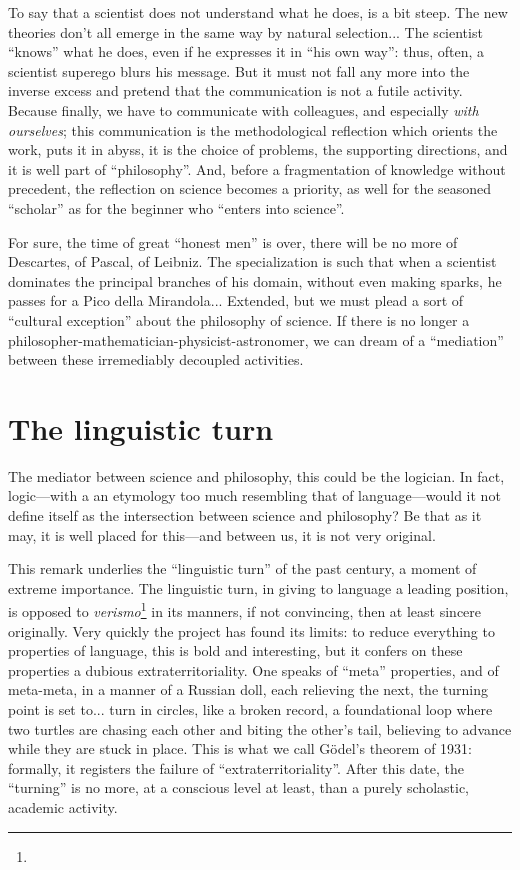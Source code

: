 \documentclass{article}
\begin{document}
To say that a scientist does not understand what he does, is a bit steep. The new theories don't all emerge in the same way by natural selection... The scientist \enquote{knows} what he does, even if he expresses it in \enquote{his own way}: thus, often, a scientist superego blurs his message. But it must not fall any more into the inverse excess and pretend that the communication is not a futile activity. Because finally, we have to communicate with colleagues, and especially \emph{with ourselves}; this communication is the methodological reflection which orients the work, puts it in abyss, it is the choice of problems, the supporting directions, and it is well part of \enquote{philosophy}. And, before a fragmentation of knowledge without precedent, the reflection on science becomes a priority, as well for the seasoned \enquote{scholar} as for the beginner who \enquote{enters into science}.

For sure, the time of great \enquote{honest men} is over, there will be no more of Descartes, of Pascal, of Leibniz. The specialization is such that when a scientist dominates the principal branches of his domain, without even making sparks, he passes for a Pico della Mirandola... Extended, but we must plead a sort of \enquote{cultural exception} about the philosophy of science. If there is no longer a philosopher-mathematician-physicist-astronomer, we can dream of a \enquote{mediation} between these irremediably decoupled activities.

\section{The linguistic turn}
The mediator between science and philosophy, this could be the logician. In fact, logic---with a an etymology too much resembling that of language---would it not define itself as the intersection between science and philosophy? Be that as it may, it is well placed for this---and between us, it is not very original.

This remark underlies the \enquote{linguistic turn} of the past century, a moment of extreme importance. The linguistic turn, in giving to language a leading position, is opposed to \emph{verismo}\footnote{} in its manners, if not convincing, then at least sincere originally. Very quickly the project has found its limits: to reduce everything to properties of language, this is bold and interesting, but it confers on these properties a dubious extraterritoriality. One speaks of \enquote{meta} properties, and of meta-meta, in a manner of a Russian doll, each relieving the next, the turning point is set to... turn in circles, like a broken record, a foundational loop where two turtles are chasing each other and biting the other's tail, believing to advance while they are stuck in place. This is what we call Gödel's theorem of 1931: formally, it registers the failure of \enquote{extraterritoriality}. After this date, the \enquote{turning} is no more, at a conscious level at least, than a purely scholastic, academic activity.
\end{document}
